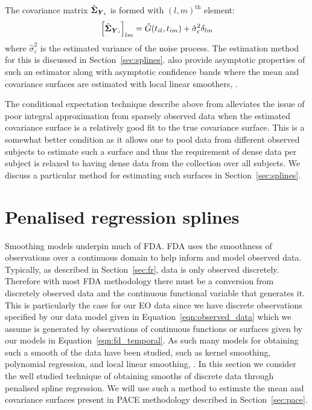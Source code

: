 The covariance matrix $\hat{\bm{{\Sigma}}}_{\bm{{Y}}_{i}}$ is formed with $\left(l, m\right)^\text{th}$ element:
\begin{equation}\label{eqn:sig_cov}
	\left[\hat{\bm{{\Sigma}}}_{\bm{{Y}}_{i}}\right]_{lm} = \hat{G}(t_{il}, t_{im}) + \hat{\sigma}_\varepsilon^2 \delta_{lm}
\end{equation}
where $\hat{\sigma}_\varepsilon^2$ is the estimated variance of the noise process.
The estimation method for this is discussed in Section~\ref{sec:splines}.
\citeauthor{yao_functional_2005} also provide asymptotic properties of such an estimator  along with asymptotic confidence bands where the mean and covariance surfaces are estimated with local linear smoothers, \citep{fan_study_1996}.

The conditional expectation technique describe above from \citep{yao_functional_2005} alleviates the issue of poor integral approximation from sparsely observed data when the estimated covariance surface is a relatively good fit to the true covariance surface.
This is a somewhat better condition as it allows one to pool data from different observed subjects to estimate such a surface and thus the requirement of dense data per subject is relaxed to having dense data from the collection over all subjects.
We discuss a particular method for estimating such surfaces in Section~\ref{sec:splines}.

\section{Penalised regression splines \label{sec:splines}}
 Smoothing models underpin much of FDA.
 FDA uses the smoothness of observations over a continuous domain to help inform and model observed data.
 Typically, as described in Section~\ref{sec:fr}, data is only observed discretely.
 Therefore with most FDA methodology there must be a conversion from discretely observed data and the continuous functional variable that generates it.
 This is particularly the case for our EO data since we have discrete observations specified by our data model given in Equation~\eqref{eqn:observed_data} which we assume is generated by observations of continuous functions or surfaces given by our models in Equation~\eqref{eqn:fd_temporal}.
 As such many models for obtaining such a smooth of the data have been studied, such as kernel smoothing, polynomial regression, and local linear smoothing, \citep[Chapter~4]{ramsay_functional_2010}. 
 In this section we consider the well studied technique of obtaining smooths of discrete data through penalised spline regression.
 We will use such a method to estimate the mean and covariance surfaces present in PACE methodology described in Section~\ref{sec:pace}. 
 
